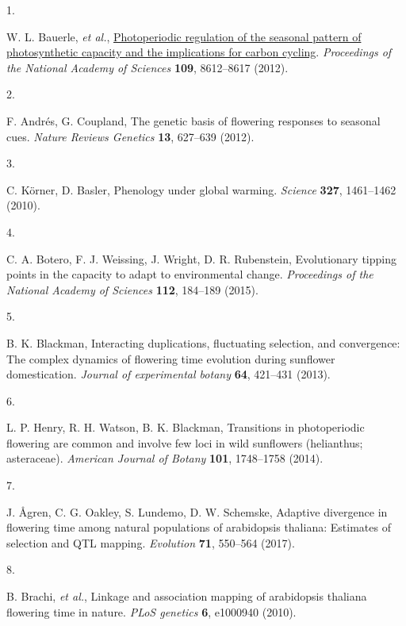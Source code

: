 \documentclass[
  9pt,
  twocolumn,
  twoside]{pnas-new}
\newlength{\cslhangindent}
\newlength{\csllabelwidth}
\newenvironment{CSLReferences}[2] %
 {\begin{list}{}{%
  \setlength{\itemindent}{0pt}
  \setlength{\leftmargin}{0pt}
  \setlength{\parsep}{0pt}
  \ifodd #1
   \setlength{\leftmargin}{\cslhangindent}
   \setlength{\itemindent}{-1\cslhangindent}
  \fi
  \setlength{\itemsep}{#2\baselineskip}}}
 {\end{list}}
\newcommand{\CSLLeftMargin}[1]{\parbox[t]{\csllabelwidth}{\strut#1\strut}}
\newcommand{\CSLRightInline}[1]{\parbox[t]{\linewidth - \csllabelwidth}{\strut#1\strut}}
\begin{document}
\label{refs}
\begin{CSLReferences}{0}{1}
\CSLLeftMargin{1. }%
\CSLRightInline{W. L. Bauerle, \emph{et al.},
\href{https://doi.org/10.1073/pnas.1119131109}{Photoperiodic regulation
of the seasonal pattern of photosynthetic capacity and the implications
for carbon cycling}. \emph{Proceedings of the National Academy of
Sciences} \textbf{109}, 8612--8617 (2012).}

\CSLLeftMargin{2. }%
\CSLRightInline{F. Andrés, G. Coupland, The genetic basis of flowering
responses to seasonal cues. \emph{Nature Reviews Genetics} \textbf{13},
627--639 (2012).}

\CSLLeftMargin{3. }%
\CSLRightInline{C. Körner, D. Basler, Phenology under global warming.
\emph{Science} \textbf{327}, 1461--1462 (2010).}

\CSLLeftMargin{4. }%
\CSLRightInline{C. A. Botero, F. J. Weissing, J. Wright, D. R.
Rubenstein, Evolutionary tipping points in the capacity to adapt to
environmental change. \emph{Proceedings of the National Academy of
Sciences} \textbf{112}, 184--189 (2015).}

\CSLLeftMargin{5. }%
\CSLRightInline{B. K. Blackman, Interacting duplications, fluctuating
selection, and convergence: The complex dynamics of flowering time
evolution during sunflower domestication. \emph{Journal of experimental
botany} \textbf{64}, 421--431 (2013).}

\CSLLeftMargin{6. }%
\CSLRightInline{L. P. Henry, R. H. Watson, B. K. Blackman, Transitions
in photoperiodic flowering are common and involve few loci in wild
sunflowers (helianthus; asteraceae). \emph{American Journal of Botany}
\textbf{101}, 1748--1758 (2014).}

\CSLLeftMargin{7. }%
\CSLRightInline{J. Ågren, C. G. Oakley, S. Lundemo, D. W. Schemske,
Adaptive divergence in flowering time among natural populations of
arabidopsis thaliana: Estimates of selection and QTL mapping.
\emph{Evolution} \textbf{71}, 550--564 (2017).}

\CSLLeftMargin{8. }%
\CSLRightInline{B. Brachi, \emph{et al.}, Linkage and association
mapping of arabidopsis thaliana flowering time in nature. \emph{PLoS
genetics} \textbf{6}, e1000940 (2010).}


\end{CSLReferences}
\end{document}
